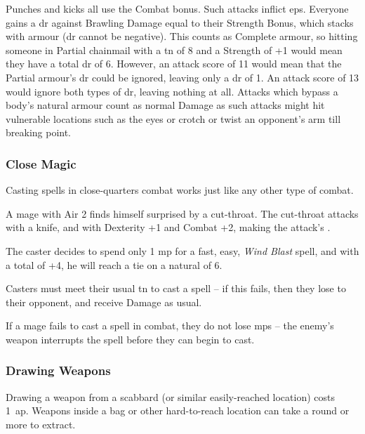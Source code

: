 \begin{multicols}{2}
Punches and kicks all use the Combat bonus.
Such attacks inflict \glspl{ep}.
Everyone gains a \gls{dr} against Brawling Damage equal to their Strength Bonus, which stacks with armour (\gls{dr} cannot be negative).
This counts as Complete armour, so hitting someone in Partial chainmail with a \gls{tn} of 8 and a Strength of +1 would mean they have a total \gls{dr} of 6.
However, an attack score of 11 would mean that the Partial armour's \gls{dr} could be ignored, leaving only a \gls{dr} of 1.
An attack score of 13 would ignore both types of \gls{dr}, leaving nothing at all.
Attacks which bypass a body's natural armour count as normal Damage as such attacks might hit vulnerable locations such as the eyes or crotch or twist an opponent's arm till breaking point.

\subsubsection[Close Magic: Casters roll vs the enemy's standard Attack score]{Close Magic}

Casting spells in close-quarters combat works just like any other type of combat.

\begin{exampletext}
  A mage with Air 2 finds himself surprised by a cut-throat.
  The cut-throat attacks with a knife, and with Dexterity +1 and Combat +2, making the attack's \tn[10].

  The caster decides to spend only 1 \gls{mp} for a fast, easy, \textit{Wind Blast} spell, and with a  total of +4, he will reach a tie on a \gls{natural} of 6.
\end{exampletext}

Casters must meet their usual \gls{tn} to cast a spell -- if this fails, then they lose to their opponent, and receive Damage as usual.

If a mage fails to cast a spell in combat, they do not lose \glspl{mp} -- the enemy's weapon interrupts the spell before they can begin to cast.

\subsubsection[Drawing Weapon -- Cost: 1 \glsentrytext{ap}]{Drawing Weapons}

Drawing a weapon from a scabbard (or similar easily-reached location) costs 1~\gls{ap}.
Weapons inside a bag or other hard-to-reach location can take a round or more to extract.


\end{multicols}
